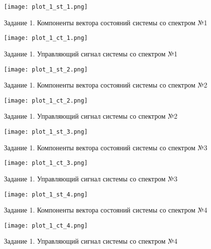 \begin{figure}[]
    \centering
    \texttt{[image: plot\_1\_st\_1.png]}
    \caption{\label{fig:The-caption-1}Задание 1. Компоненты вектора состояний системы со спектром №1}
\end{figure}
\begin{figure}[]
    \centering
    \texttt{[image: plot\_1\_ct\_1.png]}
    \caption{\label{fig:The-caption-1}Задание 1. Управляющий сигнал системы со спектром №1}
\end{figure}
\begin{figure}[]
    \centering
    \texttt{[image: plot\_1\_st\_2.png]}
    \caption{\label{fig:The-caption-1}Задание 1. Компоненты вектора состояний системы со спектром №2}
\end{figure}
\begin{figure}[]
    \centering
    \texttt{[image: plot\_1\_ct\_2.png]}
    \caption{\label{fig:The-caption-1}Задание 1. Управляющий сигнал системы со спектром №2}
\end{figure}
\begin{figure}[]
    \centering
    \texttt{[image: plot\_1\_st\_3.png]}
    \caption{\label{fig:The-caption-1}Задание 1. Компоненты вектора состояний системы со спектром №3}
\end{figure}
\begin{figure}[]
    \centering
    \texttt{[image: plot\_1\_ct\_3.png]}
    \caption{\label{fig:The-caption-1}Задание 1. Управляющий сигнал системы со спектром №3}
\end{figure}
\begin{figure}[]
    \centering
    \texttt{[image: plot\_1\_st\_4.png]}
    \caption{\label{fig:The-caption-1}Задание 1. Компоненты вектора состояний системы со спектром №4}
\end{figure}
\begin{figure}[]
    \centering
    \texttt{[image: plot\_1\_ct\_4.png]}
    \caption{\label{fig:The-caption-1}Задание 1. Управляющий сигнал системы со спектром №4}
\end{figure}
\pagebreak

